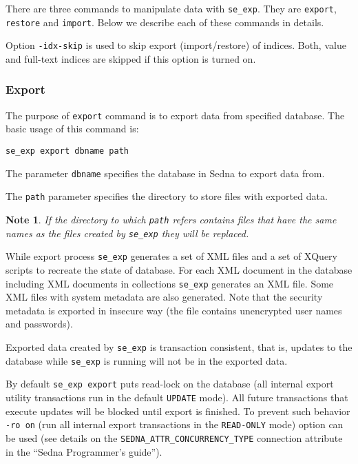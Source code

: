 \documentclass[a4paper,12pt]{article}
\newtheorem{note}{Note}    %
\begin{document}
There are three commands to manipulate data with \verb!se_exp!. They are
\verb!export!, \verb!restore! and \verb!import!. Below we describe each of these
commands in details.

Option \verb!-idx-skip! is used to skip export (import/restore) of indices.
Both, value and full-text indices are skipped if this option is turned on.

\subsubsection*{Export}

The purpose of \verb!export! command is to export data from specified database.
The basic usage of this command is:

\begin{verbatim}
se_exp export dbname path
\end{verbatim}

The parameter \verb!dbname! specifies the database in Sedna to export data from.

The \verb!path! parameter specifies the directory to store files with exported
data.

\begin{note}
If the directory to which \verb!path! refers contains files that have the same
names as the files created by \verb!se_exp! they will be replaced.
\end{note}

While export process \verb!se_exp! generates a set of XML files and a set of
XQuery scripts to recreate the state of database. For each XML document in the
database including XML documents in collections \verb!se_exp! generates an XML
file. Some XML files with system metadata are also generated. Note that the
security metadata is exported in insecure way (the file contains unencrypted
user names and passwords).

Exported data created by \verb!se_exp! is transaction consistent, that is,
updates to the database while \verb!se_exp! is running will not be in the
exported data.

By default \verb!se_exp export! puts read-lock on the database (all internal
export utility transactions run in the default \verb!UPDATE! mode). All future
transactions that execute updates will be blocked until export is finished. To
prevent such behavior \verb!-ro on! (run all internal export transactions in
the \verb!READ-ONLY! mode) option can be used (see details on the
\verb!SEDNA_ATTR_CONCURRENCY_TYPE! connection attribute in the ``Sedna
Programmer's guide'').
\end{document}

